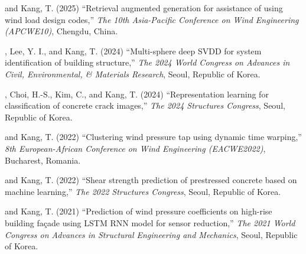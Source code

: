 \begin{pubSubsectionNum}
    \item \me and Kang, T. (2025) ``Retrieval augmented generation for assistance of using wind load design codes,'' \textit{The 10th Asia-Pacific Conference on Wind Engineering (APCWE10)}, Chengdu, China.
    \item \me, Lee, Y. I., and Kang, T. (2024) ``Multi-sphere deep SVDD for system identification of building structure,'' \textit{The 2024 World Congress on Advances in Civil, Environmental, \& Materials Research}, Seoul, Republic of Korea.
    \item \me, Choi, H.-S., Kim, C., and Kang, T. (2024) ``Representation learning for classification of concrete crack images,'' \textit{The 2024 Structures Congress}, Seoul, Republic of Korea.
    \item \me and Kang, T. (2022) ``Clustering wind pressure tap using dynamic time warping,'' \textit{8th European-African Conference on Wind Engineering (EACWE2022)}, Bucharest, Romania.
    \item \me and Kang, T. (2022) ``Shear strength prediction of prestressed concrete based on machine learning,'' \textit{The 2022 Structures Congress}, Seoul, Republic of Korea.
    \item \me and Kang, T. (2021) ``Prediction of wind pressure coefficients on high-rise building façade using LSTM RNN model for sensor reduction,'' \textit{The 2021 World Congress on Advances in Structural Engineering and Mechanics}, Seoul, Republic of Korea.
\end{pubSubsectionNum}
